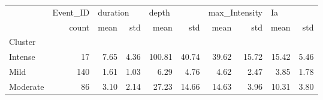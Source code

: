 \begin{tabular}{lrrrrrrrrr}
\toprule
{} & Event\_ID & \multicolumn{2}{l}{duration} & \multicolumn{2}{l}{depth} & \multicolumn{2}{l}{max\_Intensity} & \multicolumn{2}{l}{Ia} \\
{} &    count &     mean &   std &    mean &    std &          mean &    std &   mean &   std \\
Cluster  &          &          &       &         &        &               &        &        &       \\
\midrule
Intense  &       17 &     7.65 &  4.36 &  100.81 &  40.74 &         39.62 &  15.72 &  15.42 &  5.46 \\
Mild     &      140 &     1.61 &  1.03 &    6.29 &   4.76 &          4.62 &   2.47 &   3.85 &  1.78 \\
Moderate &       86 &     3.10 &  2.14 &   27.23 &  14.66 &         14.63 &   3.96 &  10.31 &  3.80 \\
\bottomrule
\end{tabular}
